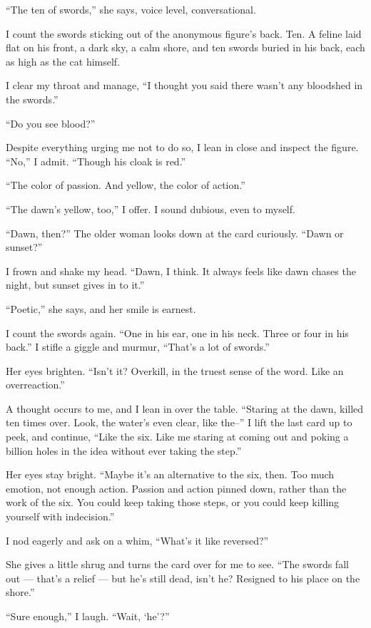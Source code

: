 ``The ten of swords,'' she says, voice level, conversational.

I count the swords sticking out of the anonymous figure's back. Ten. A feline laid flat on his front, a dark sky, a calm shore, and ten swords buried in his back, each as high as the cat himself.

I clear my throat and manage, ``I thought you said there wasn't any bloodshed in the swords.''

``Do you see blood?''

Despite everything urging me not to do so, I lean in close and inspect the figure. ``No,'' I admit. ``Though his cloak is red.''

``The color of passion. And yellow, the color of action.''

``The dawn's yellow, too,'' I offer. I sound dubious, even to myself.

``Dawn, then?'' The older woman looks down at the card curiously. ``Dawn or sunset?''

I frown and shake my head. ``Dawn, I think. It always feels like dawn chases the night, but sunset gives in to it.''

``Poetic,'' she says, and her smile is earnest.

I count the swords again. ``One in his ear, one in his neck. Three or four in his back.'' I stifle a giggle and murmur, ``That's a lot of swords.''

Her eyes brighten. ``Isn't it? Overkill, in the truest sense of the word. Like an overreaction.''

A thought occurs to me, and I lean in over the table. ``Staring at the dawn, killed ten times over. Look, the water's even clear, like the--'' I lift the last card up to peek, and continue, ``Like the six. Like me staring at coming out and poking a billion holes in the idea without ever taking the step.''

Her eyes stay bright. ``Maybe it's an alternative to the six, then. Too much emotion, not enough action. Passion and action pinned down, rather than the work of the six. You could keep taking those steps, or you could keep killing yourself with indecision.''

I nod eagerly and ask on a whim, ``What's it like reversed?''

She gives a little shrug and turns the card over for me to see. ``The swords fall out --- that's a relief --- but he's still dead, isn't he? Resigned to his place on the shore.''

``Sure enough,'' I laugh. ``Wait, `he'?''

